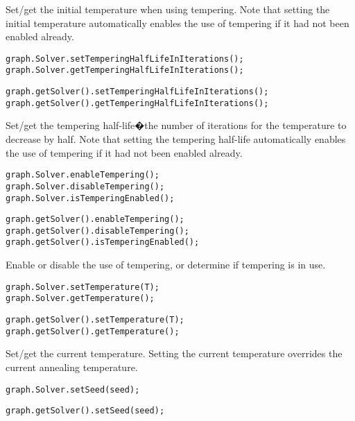 Set/get the initial temperature when using tempering. Note that setting the initial temperature automatically enables the use of tempering if it had not been enabled already.

\ifmatlab
\begin{lstlisting}
graph.Solver.setTemperingHalfLifeInIterations();
graph.Solver.getTemperingHalfLifeInIterations();
\end{lstlisting}
\fi

\ifjava
\begin{lstlisting}
graph.getSolver().setTemperingHalfLifeInIterations();
graph.getSolver().getTemperingHalfLifeInIterations();
\end{lstlisting}
\fi

Set/get the tempering half-life�the number of iterations for the temperature to decrease by half. Note that setting the tempering half-life automatically enables the use of tempering if it had not been enabled already.

\ifmatlab
\begin{lstlisting}
graph.Solver.enableTempering();
graph.Solver.disableTempering();
graph.Solver.isTemperingEnabled();
\end{lstlisting}
\fi

\ifjava
\begin{lstlisting}
graph.getSolver().enableTempering();
graph.getSolver().disableTempering();
graph.getSolver().isTemperingEnabled();
\end{lstlisting}
\fi

Enable or disable the use of tempering, or determine if tempering is in use.

\ifmatlab
\begin{lstlisting}
graph.Solver.setTemperature(T);
graph.Solver.getTemperature();
\end{lstlisting}
\fi

\ifjava
\begin{lstlisting}
graph.getSolver().setTemperature(T);
graph.getSolver().getTemperature();
\end{lstlisting}
\fi

Set/get the current temperature. Setting the current temperature overrides the current annealing temperature.

\ifmatlab
\begin{lstlisting}
graph.Solver.setSeed(seed);
\end{lstlisting}
\fi

\ifjava
\begin{lstlisting}
graph.getSolver().setSeed(seed);
\end{lstlisting}
\fi

